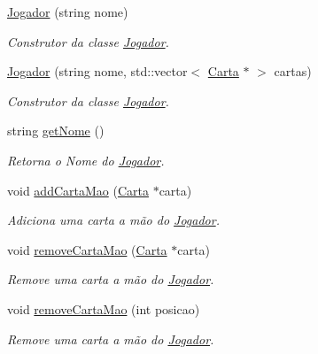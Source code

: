 \begin{DoxyCompactItemize}
\item 
\mbox{\hyperlink{class_jogador_a166616aae3af6eefcc804a70d70f1359}{Jogador}} (string nome)
\begin{DoxyCompactList}\small\item\em Construtor da classe \mbox{\hyperlink{class_jogador}{Jogador}}. \end{DoxyCompactList}\item 
\mbox{\hyperlink{class_jogador_a2c4a7000bda1bf0390b3b00c1066a71f}{Jogador}} (string nome, std\+::vector$<$ \mbox{\hyperlink{class_carta}{Carta}} $\ast$ $>$ cartas)
\begin{DoxyCompactList}\small\item\em Construtor da classe \mbox{\hyperlink{class_jogador}{Jogador}}. \end{DoxyCompactList}\item 
string \mbox{\hyperlink{class_jogador_ad99c974eb0be82064fbca936adc246d9}{get\+Nome}} ()
\begin{DoxyCompactList}\small\item\em Retorna o Nome do \mbox{\hyperlink{class_jogador}{Jogador}}. \end{DoxyCompactList}\item 
void \mbox{\hyperlink{class_jogador_a01b6af5be0bb3789d1450f8a8f0e99d4}{add\+Carta\+Mao}} (\mbox{\hyperlink{class_carta}{Carta}} $\ast$carta)
\begin{DoxyCompactList}\small\item\em Adiciona uma carta a mão do \mbox{\hyperlink{class_jogador}{Jogador}}. \end{DoxyCompactList}\item 
void \mbox{\hyperlink{class_jogador_ab835948a3cc9f4876e8d5a417b8c4d2f}{remove\+Carta\+Mao}} (\mbox{\hyperlink{class_carta}{Carta}} $\ast$carta)
\begin{DoxyCompactList}\small\item\em Remove uma carta a mão do \mbox{\hyperlink{class_jogador}{Jogador}}. \end{DoxyCompactList}\item 
void \mbox{\hyperlink{class_jogador_a9c9a6a3b7460ccd81b800211ead01da2}{remove\+Carta\+Mao}} (int posicao)
\begin{DoxyCompactList}\small\item\em Remove uma carta a mão do \mbox{\hyperlink{class_jogador}{Jogador}}. \end{DoxyCompactList}\item 

\end{DoxyCompactItemize}
